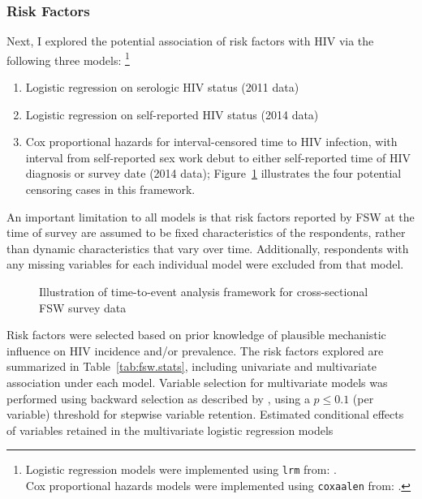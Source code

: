 \subsubsection{Risk Factors}\label{model.par.fsw.fac}
Next, I explored the potential association of risk factors with HIV
via the following three models:%
\footnote{Logistic regression models were implemented using \texttt{lrm} from:
  .\\
Cox proportional hazards models were implemented using \texttt{coxaalen} from:
  .}
\begin{enumerate}
  \item Logistic regression on serologic HIV status (2011 data)
  \item Logistic regression on self-reported HIV status (2014 data)
  \item Cox proportional hazards for interval-censored time to HIV infection,
    with interval from self-reported sex work debut 
    to either self-reported time of HIV diagnosis or survey date (2014 data);
    Figure~\ref{fig:fsw.tte.interval} illustrates
    the four potential censoring cases in this framework.
\end{enumerate}
An important limitation to all models is that
risk factors reported by FSW at the time of survey
are assumed to be fixed characteristics of the respondents,
rather than dynamic characteristics that vary over time.
Additionally, respondents with any missing variables for each individual model
were excluded from that model. %
\begin{figure}
  \centering
  \caption{Illustration of time-to-event analysis framework
    for cross-sectional FSW survey data}
  \label{fig:fsw.tte.interval}
\end{figure}
\par
Risk factors were selected based on
prior knowledge of plausible mechanistic influence on HIV incidence and/or prevalence.
The risk factors explored are summarized in Table~\ref{tab:fsw.stats},
including univariate and multivariate association under each model.
Variable selection for multivariate models
was performed using backward selection as described by \citet{Lawless1978},
using a $p \le 0.1$ (per variable) threshold for stepwise variable retention.
Estimated conditional effects of
variables retained in the multivariate logistic regression models
